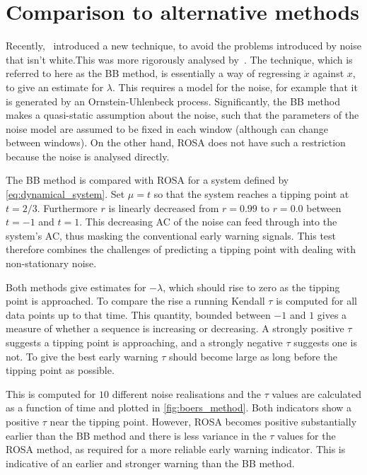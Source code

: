 \section{Comparison to alternative methods}
Recently,~\cite{Boers2021a} introduced a new technique,
to avoid the problems introduced by noise that isn't white.This was
more rigorously analysed by~\cite{Boettner2022}. The
technique, which is referred to here as the BB method, is essentially a way of
regressing $\dot{x}$ against $x$, to give an estimate for $\lambda$. 
This requires a model for the noise, for example that it is
generated by an Ornstein-Uhlenbeck process. Significantly, the BB method makes a quasi-static assumption about the noise, such that the parameters of the noise
model are assumed to be fixed in each window (although can change between windows). On the other hand,
ROSA does not have such a restriction because the noise is analysed directly.

The BB method is compared with ROSA for a system defined by
\cref{eq:dynamical_system}. Set $\mu  = t$ so that the system
reaches a tipping point at $t=2/3$. Furthermore $r$ is linearly decreased
from $r=0.99$ to $r=0.0$ between $t=-1$ and $t=1$.
This decreasing AC of the
noise can feed through into the system's AC, thus masking
the conventional early warning signals. This test therefore
combines the challenges of predicting a tipping point with dealing
with non-stationary noise.

Both methods give estimates for $-\lambda$, which should rise
to zero as the tipping point is approached. To compare the 
rise a running Kendall $\tau$ \parencite{Wilks2019} is computed for all data points up to
that time. This quantity, bounded 
between $-1$ and $1$ gives a measure of whether a sequence is 
increasing or decreasing. A strongly positive $\tau$ suggests a tipping point is approaching, and a strongly
negative $\tau$ suggests one is not. To give the best early warning $\tau$ should become
large as long before the tipping point as possible.


This is computed for $10$ different noise realisations and the $\tau$ values are calculated as a function of time and plotted  
in \cref{fig:boers_method}. Both indicators show a positive 
$\tau$ near the tipping point. However, ROSA becomes positive substantially earlier than the BB method and there is
less variance in the $\tau$ values for the ROSA method, as required for a more reliable early warning indicator.
This is indicative of an earlier and stronger warning than the BB method. 

